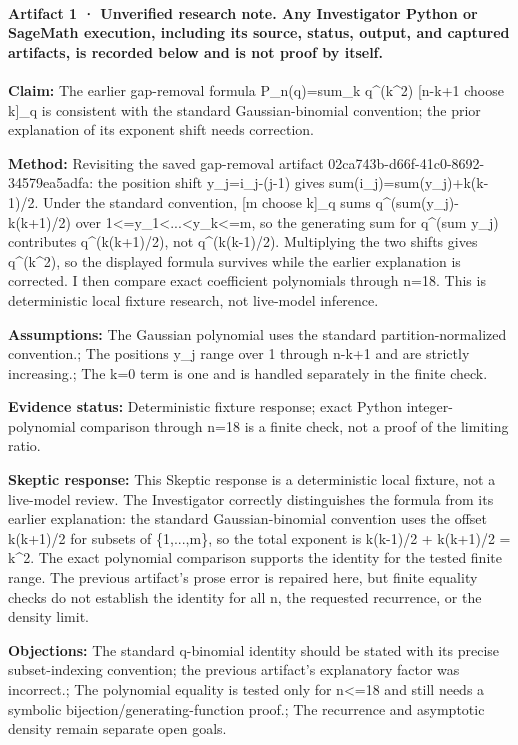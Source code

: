 \documentclass[11pt]{article}
\begin{document}
\paragraph{Artifact 1 · Unverified research note. Any Investigator Python or SageMath execution, including its source, status, output, and captured artifacts, is recorded below and is not proof by itself.}
\textbf{Claim:} The earlier gap-removal formula P\_n(q)=sum\_k q\textasciicircum{}(k\textasciicircum{}2) [n-k+1 choose k]\_q is consistent with the standard Gaussian-binomial convention; the prior explanation of its exponent shift needs correction.\par
\textbf{Method:} Revisiting the saved gap-removal artifact 02ca743b-d66f-41c0-8692-34579ea5adfa: the position shift y\_j=i\_j-(j-1) gives sum(i\_j)=sum(y\_j)+k(k-1)/2. Under the standard convention, [m choose k]\_q sums q\textasciicircum{}(sum(y\_j)-k(k+1)/2) over 1\textless{}=y\_1\textless{}...\textless{}y\_k\textless{}=m, so the generating sum for q\textasciicircum{}(sum y\_j) contributes q\textasciicircum{}(k(k+1)/2), not q\textasciicircum{}(k(k-1)/2). Multiplying the two shifts gives q\textasciicircum{}(k\textasciicircum{}2), so the displayed formula survives while the earlier explanation is corrected. I then compare exact coefficient polynomials through n=18. This is deterministic local fixture research, not live-model inference.\par
\textbf{Assumptions:} The Gaussian polynomial uses the standard partition-normalized convention.; The positions y\_j range over 1 through n-k+1 and are strictly increasing.; The k=0 term is one and is handled separately in the finite check.\par
\textbf{Evidence status:} Deterministic fixture response; exact Python integer-polynomial comparison through n=18 is a finite check, not a proof of the limiting ratio.\par
\textbf{Skeptic response:} This Skeptic response is a deterministic local fixture, not a live-model review. The Investigator correctly distinguishes the formula from its earlier explanation: the standard Gaussian-binomial convention uses the offset k(k+1)/2 for subsets of \{1,...,m\}, so the total exponent is k(k-1)/2 + k(k+1)/2 = k\textasciicircum{}2. The exact polynomial comparison supports the identity for the tested finite range. The previous artifact's prose error is repaired here, but finite equality checks do not establish the identity for all n, the requested recurrence, or the density limit.\par
\textbf{Objections:} The standard q-binomial identity should be stated with its precise subset-indexing convention; the previous artifact's explanatory factor was incorrect.; The polynomial equality is tested only for n\textless{}=18 and still needs a symbolic bijection/generating-function proof.; The recurrence and asymptotic density remain separate open goals.\par
\end{document}
